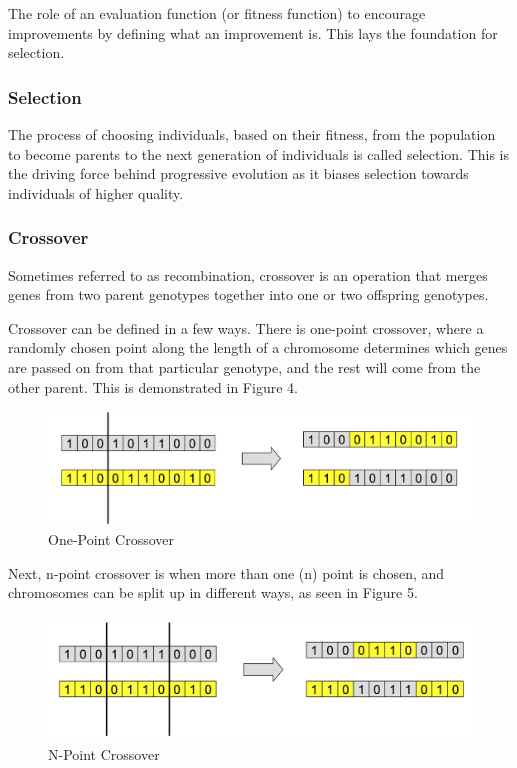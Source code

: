 \documentclass[12pt,a4paper]{article}
\begin{document}
The role of an evaluation function (or fitness function) to encourage improvements by defining what an improvement is\citep{IntroductionToEvolutionaryComputing}. This lays the foundation for selection. 

\subsubsection{Selection}
The process of choosing individuals, based on their fitness, from the population to become parents to the next generation of individuals is called selection\citep{IntroductionToEvolutionaryComputing}. This is the driving force behind progressive evolution as it biases selection towards individuals of higher quality. 

\subsubsection{Crossover}
Sometimes referred to as recombination, crossover is an operation that merges genes from two parent genotypes together into one or two offspring genotypes\citep{IntroductionToEvolutionaryComputing}. 

Crossover can be defined in a few ways. There is one-point crossover, where a randomly chosen point along the length of a chromosome determines which genes are passed on from that particular genotype, and the rest will come from the other parent. This is demonstrated in Figure 4.

\begin{figure}[h]
	\centering
	\includegraphics[width = \textwidth]{OnePointCrossover.png}
	\caption{One-Point Crossover}
\end{figure}

Next, n-point crossover is when more than one (n) point is chosen, and chromosomes can be split up in different ways, as seen in Figure 5. 

\begin{figure}[h]
	\centering
	\includegraphics[width = \textwidth]{NPointCrossover.png}
	\caption{N-Point Crossover}
\end{figure}
\end{document}
